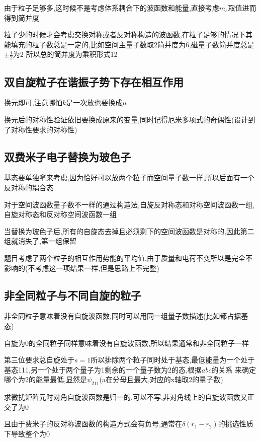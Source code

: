 \documentclass{article}
\begin{document}
            由于粒子足够多,这时候不是考虑体系耦合下的波函数和能量,直接考虑$m_{s}$取值进而得到简并度

            粒子少的时候才会考虑交换对称或者反对称构造的波函数,在粒子足够的情况下其能填充的粒子数总是一定的,比如空间主量子数取2简并度为6,磁量子数简并度总是$\pm\frac{1}{2}$为2
            所以总的简并度为乘积形式12
        
        
        \subsection{双自旋粒子在谐振子势下存在相互作用}
            换元即可,注意哪怕$k$是一次放也要换成$\mu$

            换元后的对称性验证依旧要换成原来的变量,同时记得厄米多项式的奇偶性(设计到了对称性要求的对称性)

        \subsection{双费米子电子替换为玻色子}
            基态要单独拿来考虑,因为恰好可以放两个粒子而空间量子数一样,所以后面有一个反对称的耦合态

            对于空间波函数量子数不一样的通过构造法,自旋反对称态和对称空间波函数一组,自旋对称态和反对称空间波函数一组

            当替换为玻色子后,所有的自旋态去掉且必须剩下的空间波函数是对称的,因此第二组就消失了,第一组保留

            题目考虑了两个粒子的相互作用势能的平均值,由于质量和电荷不变所以是完全不影响的(不考虑这一项结果一样,但是思路上不完整)

        \subsection{非全同粒子与不同自旋的粒子}
            非全同粒子意味着没有自旋波函数,同时可以用同一组量子数描述(比如都占据基态)

            自旋为0的全同粒子同样意味着没有自旋波函数,所以结果通常和非全同粒子一样

            第三位要求总自旋处于$s=1$所以排除两个粒子同时处于基态,最低能量为一个处于基态111,另一个处于两个量子为1剩余的一个量子数为2的态,根据$abc$的关系
            来确定哪个为2的能量最低,显然是$\psi_{211}$(a在分母且最大,对应的x轴取2的量子数)

            求微扰矩阵元时对角自旋波函数是归一的,可以不写,非对角线上的自旋波函数又正交了为0

            且由于费米子的反对称波函数的构造方式会有负号,通常在$\delta(r_{1}-r_{2})$的挑选性质下导致整个为0 
\end{document}
